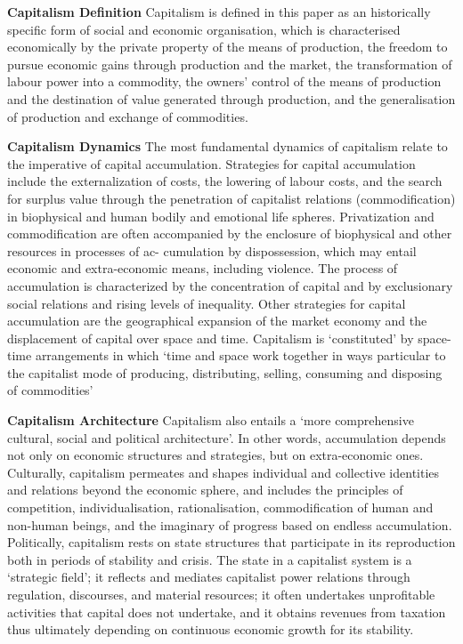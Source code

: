 \documentclass[
]{book}
\begin{document}
\textbf{Capitalism Definition}
Capitalism is defined in this paper as an historically specific form of social and economic organisation, which is characterised
economically by the private property of the means of production, the freedom to pursue economic gains through production and the
market, the transformation of labour power into a commodity, the owners' control of the means of production and the destination of
value generated through production, and the generalisation of production and exchange of commodities.

\textbf{Capitalism Dynamics}
The most fundamental dynamics of capitalism relate to the imperative of capital accumulation.
Strategies for
capital accumulation include the externalization of costs, the lowering of labour costs, and the search for surplus value through the
penetration of capitalist relations (commodification) in biophysical and human bodily and emotional life spheres.
Privatization and commodification are often accompanied by the enclosure of biophysical and other resources in processes of ac-
cumulation by dispossession, which may entail economic and extra-economic means, including violence. The
process of accumulation is characterized by the concentration of capital and by exclusionary social relations and rising levels of
inequality. Other strategies for capital accumulation are the geographical expansion of the market
economy and the displacement of capital over space and time. Capitalism is `constituted' by space-time arrangements
in which `time and space work together in ways particular to the capitalist mode of producing, distributing, selling, consuming and
disposing of commodities'

\textbf{Capitalism Architecture}
Capitalism also entails a `more comprehensive cultural, social and political architecture'.
In other words, accumulation depends not only on economic structures and strategies, but on extra-economic ones.
Culturally, capitalism permeates and shapes individual and collective identities and relations beyond the economic sphere, and
includes the principles of competition, individualisation, rationalisation, commodification of human and non-human beings, and the
imaginary of progress based on endless accumulation. Politically,
capitalism rests on state structures that participate in its reproduction both in periods of stability and crisis. The state in a capitalist
system is a `strategic field'; it reflects and mediates capitalist power relations through
regulation, discourses, and material resources; it often undertakes unprofitable activities that capital does not undertake, and it
obtains revenues from taxation thus ultimately depending on continuous economic growth for its stability.
\end{document}
